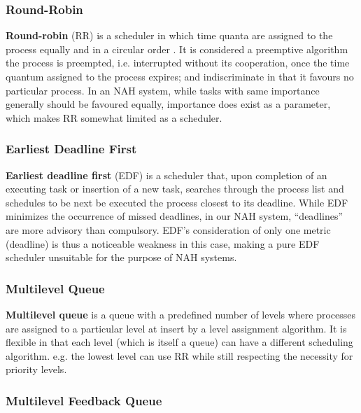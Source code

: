 \documentclass[letterpaper, twocolumn, 10pt, conference]{IEEEtran}
\newcommand{\term}[1]{\textbf{#1}}
\begin{document}
\subsubsection{Round-Robin} \label{sssec:round_robin_scheduler}

\term{Round-robin} (RR) is a scheduler in which time quanta are assigned to the process equally and in a circular order \cite[pp. 69--70]{arpaci-dusseau14-book}. It is considered a preemptive algorithm the process is preempted, i.e. interrupted without its cooperation, once the time quantum assigned to the process expires; and indiscriminate in that it favours no particular process. In an NAH system, while tasks with same importance generally should be favoured equally, importance does exist as a parameter, which makes RR somewhat limited as a scheduler.

\subsubsection{Earliest Deadline First} \label{sssec:edf_scheduler}

\term{Earliest deadline first} (EDF) is a scheduler that, upon completion of an executing task or insertion of a new task, searches through the process list and schedules to be next be executed the process closest to its deadline. While EDF minimizes the occurrence of missed deadlines, in our NAH system, \enquote{deadlines} are more advisory than compulsory. EDF's consideration of only one metric (deadline) is thus a noticeable weakness in this case, making a pure EDF scheduler unsuitable for the purpose of NAH systems.

\subsubsection{Multilevel Queue} \label{sssec:multilevel_queue}

\term{Multilevel queue} is a queue with a predefined number of levels where processes are assigned to a particular level at insert by a level assignment algorithm. It is flexible in that each level (which is itself a queue) can have a different scheduling algorithm. e.g. the lowest level can use RR while still respecting the necessity for priority levels.

\subsubsection{Multilevel Feedback Queue} \label{sssec:multilevel_feedback_queue}
\end{document}
